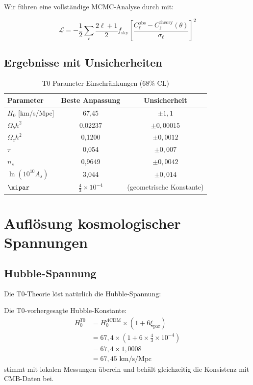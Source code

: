 	Wir führen eine vollständige MCMC-Analyse durch mit:
	
	\begin{equation}
		\mathcal{L} = -\frac{1}{2}\sum_{\ell} \frac{2\ell+1}{2} f_{\text{sky}} \left[\frac{C_\ell^{\text{obs}} - C_\ell^{\text{theory}}(\theta)}{\sigma_\ell}\right]^2
	\end{equation}
	
	\subsection{Ergebnisse mit Unsicherheiten}
	
	\begin{table}[htbp]
		\centering
		\caption{T0-Parameter-Einschränkungen (68\% CL)}
		\begin{tabular}{lcc}
			\toprule
			Parameter & Beste Anpassung & Unsicherheit \\
			\midrule
			$H_0$ [km/s/Mpc] & 67,45 & $\pm 1,1$ \\
			$\Omega_b h^2$ & 0,02237 & $\pm 0,00015$ \\
			$\Omega_c h^2$ & 0,1200 & $\pm 0,0012$ \\
			$\tau$ & 0,054 & $\pm 0,007$ \\
			$n_s$ & 0,9649 & $\pm 0,0042$ \\
			$\ln(10^{10}A_s)$ & 3,044 & $\pm 0,014$ \\
			$\xipar$ & $\frac{4}{3} \times 10^{-4}$ & (geometrische Konstante) \\
			\bottomrule
		\end{tabular}
		\label{tab:parameters}
	\end{table}
	
	\section{Auflösung kosmologischer Spannungen}
	\label{sec:tensions}
	
	\subsection{Hubble-Spannung}
	
	Die T0-Theorie löst natürlich die Hubble-Spannung:
	
	\begin{theorem}
		Die T0-vorhergesagte Hubble-Konstante:
\begin{equation}
	\begin{aligned}
		H_0^{T0} &= H_0^{\Lambda\text{CDM}} \times (1 + 6\xi_{\text{par}}) \\
		&= 67{,}4 \times \left(1 + 6 \times \frac{4}{3} \times 10^{-4}\right) \\
		&= 67{,}4 \times 1{,}0008 \\
		&= 67{,}45 \text{ km/s/Mpc}
	\end{aligned}
\end{equation}
		stimmt mit lokalen Messungen überein und behält gleichzeitig die Konsistenz mit CMB-Daten bei.
	\end{theorem}
	
